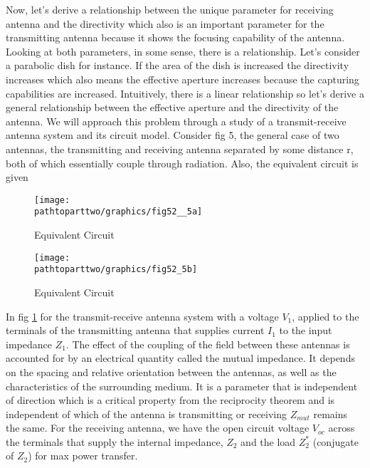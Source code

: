 Now, let's derive a relationship between the unique parameter for receiving antenna and the directivity which also is an important parameter for the transmitting antenna because it shows the focusing capability of the antenna. Looking at both parameters, in some sense, there is a relationship. Let's consider a parabolic dish for instance. If the area of the dish is increased the directivity increases which also means the effective aperture increases because the capturing capabilities are increased. Intuitively, there is a linear relationship so let's derive a general relationship between the effective aperture and the directivity of the antenna. We will approach this problem through a study of a transmit-receive antenna system and its circuit model. Consider fig 5, the general case of two antennas, the transmitting and receiving antenna separated by some distance r, both of which essentially couple through radiation. Also, the equivalent circuit is given
\begin{figure}[h]
\texttt{[image: \\pathtoparttwo/graphics/fig52\_\_5a]}
\centering
\caption{Equivalent Circuit}
\label{fig5b}	
\end{figure}

\begin{figure}[h]
\texttt{[image: \\pathtoparttwo/graphics/fig52\_5b]}
\centering
\caption{Equivalent Circuit}
\label{fig 1}	
\end{figure}

In fig \ref{fig5b} for the transmit-receive antenna system with a voltage $V_1$, applied to the terminals of the transmitting antenna that supplies current $I_{1}$ to the input impedance $Z_{1}$. The effect of the coupling of the field between these antennas is accounted for by an electrical quantity called the mutual impedance. It depends on the spacing and relative orientation between the antennas, as well as the characteristics of the surrounding medium. It is a parameter that is independent of direction which is a critical property from the reciprocity theorem and is independent of which of the antenna is transmitting or receiving $Z_{mut}$ remains the same. For the receiving antenna, we have the open circuit voltage $V_{oc}$ across the terminals that supply the internal impedance, $Z_{2}$ and the load $Z_{2}^*$ (conjugate of $Z_{2}$) for max power transfer.


